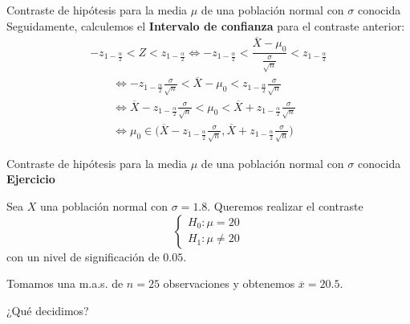 \documentclass[
  ignorenonframetext,
]{beamer}
\begin{document}
\begin{frame}{Contraste de hipótesis para la media \(\mu\) de una
población normal con \(\sigma\) conocida}
\protect\hypertarget{contraste-de-hipuxf3tesis-para-la-media-mu-de-una-poblaciuxf3n-normal-con-sigma-conocida-4}{}
Seguidamente, calculemos el \textbf{Intervalo de confianza} para el
contraste anterior: \[
\begin{array}{l}
-z_{1-\frac{\alpha}2} < Z < z_{1-\frac{\alpha}2}\Longleftrightarrow -z_{1-\frac{\alpha}2} < \dfrac{\overline{X}-\mu_0}{\frac{\sigma}{\sqrt{n}}}< z_{1-\frac{\alpha}2}\\
\qquad\Longleftrightarrow -z_{1-\frac{\alpha}2}\frac{\sigma}{\sqrt{n}}< \overline{X}-\mu_0< z_{1-\frac{\alpha}2}\frac{\sigma}{\sqrt{n}}\\\qquad \Longleftrightarrow \overline{X}-z_{1-\frac\alpha2}\frac{\sigma}{\sqrt{n}}< \mu_0< \overline{X}+z_{1-\frac{\alpha}2}\frac{\sigma}{\sqrt{n}} \\
\qquad\Longleftrightarrow\mu_0\in \Big(\overline{X}-z_{1-\frac\alpha2}\frac{\sigma}{\sqrt{n}},\overline{X}+z_{1-\frac{\alpha}2}\frac{\sigma}{\sqrt{n}}\Big)
   \end{array}
\]
\end{frame}

\begin{frame}{Contraste de hipótesis para la media \(\mu\) de una
población normal con \(\sigma\) conocida}
\protect\hypertarget{contraste-de-hipuxf3tesis-para-la-media-mu-de-una-poblaciuxf3n-normal-con-sigma-conocida-5}{}
\textbf{Ejercicio}

Sea \(X\) una población normal con \(\sigma=1.8\). Queremos realizar el
contraste \[
\left\{\begin{array}{l}
H_0:\mu=20\\ H_1:\mu\neq 20
\end{array}
\right.
\] con un nivel de significación de \(0.05\).

Tomamos una m.a.s. de \(n=25\) observaciones y obtenemos
\(\overline{x}=20.5\).

¿Qué decidimos?
\end{frame}
\end{document}

